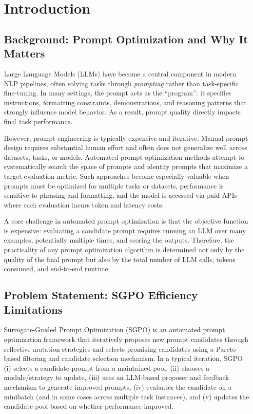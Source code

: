 \chapter{Introduction}

\section{Background: Prompt Optimization and Why It Matters}
Large Language Models (LLMs) have become a central component in modern NLP pipelines, often solving tasks through \emph{prompting} rather than task-specific fine-tuning. In many settings, the prompt acts as the ``program'': it specifies instructions, formatting constraints, demonstrations, and reasoning patterns that strongly influence model behavior. As a result, prompt quality directly impacts final task performance.

However, prompt engineering is typically expensive and iterative. Manual prompt design requires substantial human effort and often does not generalize well across datasets, tasks, or models. Automated prompt optimization methods attempt to systematically search the space of prompts and identify prompts that maximize a target evaluation metric. Such approaches become especially valuable when prompts must be optimized for multiple tasks or datasets, performance is sensitive to phrasing and formatting, and the model is accessed via paid APIs where each evaluation incurs token and latency costs.

A core challenge in automated prompt optimization is that the objective function is expensive: evaluating a candidate prompt requires running an LLM over many examples, potentially multiple times, and scoring the outputs. Therefore, the practicality of any prompt optimization algorithm is determined not only by the quality of the final prompt but also by the total number of LLM calls, tokens consumed, and end-to-end runtime.

\section{Problem Statement: SGPO Efficiency Limitations}
Surrogate-Guided Prompt Optimization (SGPO) is an automated prompt optimization framework that iteratively proposes new prompt candidates through reflective mutation strategies and selects promising candidates using a Pareto-based filtering and candidate selection mechanism. In a typical iteration, SGPO (i) selects a candidate prompt from a maintained pool, (ii) chooses a module/strategy to update, (iii) uses an LLM-based proposer and feedback mechanism to generate improved prompts, (iv) evaluates the candidate on a minibatch (and in some cases across multiple task instances), and (v) updates the candidate pool based on whether performance improved.

